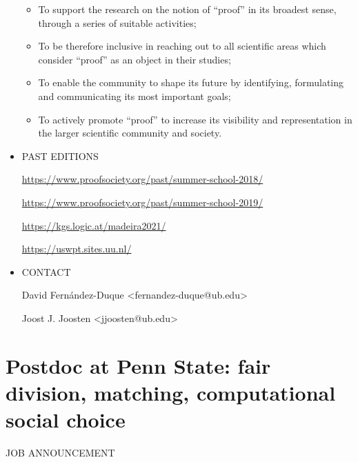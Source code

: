 \documentclass[prodmode,acmtecs]{acmsmall} %
\begin{document}
\begin{itemize}
\begin{itemize}\item  To support the research on the notion of “proof” in its broadest sense, through a series of suitable activities;
\item  To be therefore inclusive in reaching out to all scientific areas which consider “proof” as an object in their studies;
\item  To enable the community to shape its future by identifying, formulating and communicating its most important goals;
\item  To actively promote “proof” to increase its visibility and representation in the larger scientific community and society.
\end{itemize} 
\item  PAST EDITIONS 
 
  \href{https://www.proofsociety.org/past/summer-school-2018/}{https://www.proofsociety.org/past/summer-school-2018/} 
 
  \href{https://www.proofsociety.org/past/summer-school-2019/}{https://www.proofsociety.org/past/summer-school-2019/} 
 
  \href{https://kgs.logic.at/madeira2021/}{https://kgs.logic.at/madeira2021/} 
 
  \href{https://uswpt.sites.uu.nl/}{https://uswpt.sites.uu.nl/} 
 
\item  CONTACT 
 
  David Fernández-Duque <fernandez-duque@ub.edu> 
 
  Joost J. Joosten <jjoosten@ub.edu> 
 
\end{itemize}\section{Postdoc at Penn State: fair division, matching, computational social choice}\label{PostdocatPennState}JOB ANNOUNCEMENT 
\end{document}

